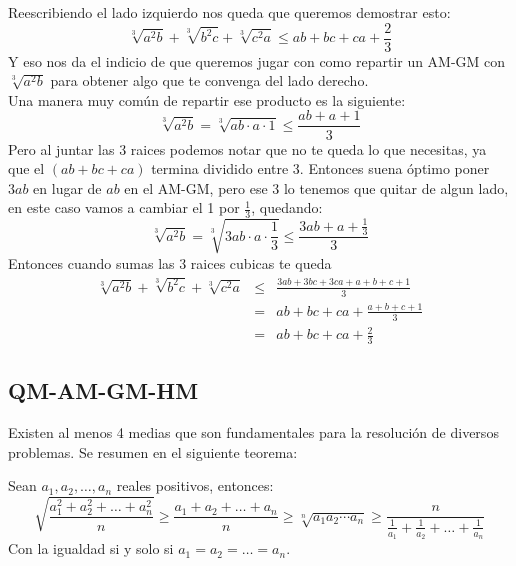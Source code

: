 \documentclass[11pt]{scrartcl}
\begin{document}
\begin{soln}

\noindent
Reescribiendo el lado izquierdo nos queda que queremos demostrar esto:
\[ \sqrt[3]{a^2b}+\sqrt[3]{b^2c}+\sqrt[3]{c^2a} \le ab+bc+ca+\frac 23\]
Y eso nos da el indicio de que queremos jugar con como repartir un AM-GM con $\sqrt[3]{a^2b}$ para obtener algo que te convenga del lado derecho. \\
Una manera muy com\'un de repartir ese producto es la siguiente:
\[ \sqrt[3]{a^2b}=\sqrt[3]{ab \cdot a\cdot 1 } \leq \frac{ab+a+1}{3}\]
Pero al juntar las 3 raices podemos notar que no te queda lo que necesitas, ya que el $(ab+bc+ca)$ termina dividido entre 3. Entonces suena \'optimo poner $3ab$ en lugar de $ab$ en el AM-GM, pero ese 3 lo tenemos que quitar de algun lado, en este caso vamos a cambiar el 1 por $\frac 13$, quedando:
\[
\sqrt[3]{a^2b}=\sqrt[3]{3ab\cdot a \cdot \frac 13}\leq \frac{3ab+a+\frac13}{3}
\]
Entonces cuando sumas las 3 raices cubicas te queda 
\begin{eqnarray*}
     \sqrt[3]{a^2b}+\sqrt[3]{b^2c}+\sqrt[3]{c^2a} &\le& \frac{3ab+3bc+3ca+a+b+c+1}{3} \\
     &=& ab+bc+ca+\frac{a+b+c+1}{3} \\
     &=& ab+bc+ca+\frac 23
\end{eqnarray*}


\end{soln}

\vspace{0.5cm}

\subsection{QM-AM-GM-HM}

\noindent
Existen al menos 4 medias que son fundamentales para la resoluci\'on de diversos problemas. Se resumen en el siguiente teorema:

\begin{theorem} [QM-AM-GM-HM]
Sean $a_1,a_2, \ldots, a_n$ reales positivos, entonces:
$$\sqrt{\frac{a_1^2+a_2^2+\ldots+a_n^2}{n}} \geq \frac{a_1+a_2+\ldots+a_n}{n} \geq \sqrt[n]{a_1a_2\cdots a_n} \geq \frac{n}{\frac{1}{a_1}+\frac{1}{a_2}+\ldots+\frac{1}{a_n}}$$
Con la igualdad si y solo si $a_1=a_2=\ldots=a_n$.
\end{theorem}
\end{document}
